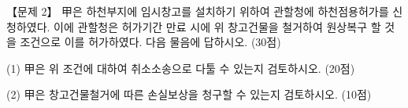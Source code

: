 \begin{longquestion}{【문제 2】}
甲은 하천부지에 임시창고를 설치하기 위하여 관할청에 하천점용허가를 신청하였다. 이에 관할청은 허가기간 만료 시에 위 창고건물을 철거하여 원상복구 할 것을 조건으로 이를 허가하였다. 다음 물음에 답하시오. (30점) \par
\medskip\noindent (1) 甲은 위 조건에 대하여 취소소송으로 다툴 수 있는지 검토하시오. (20점) \par
\medskip\noindent (2) 甲은 창고건물철거에 따른 손실보상을 청구할 수 있는지 검토하시오. (10점) \par
\end{longquestion}
